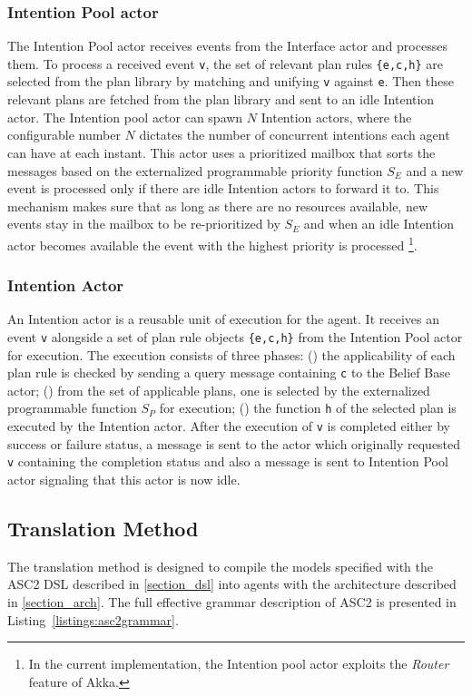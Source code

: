 \subsubsection{Intention Pool actor}
The Intention Pool actor receives events from the Interface actor and processes them. To process a received event \verb+v+, the set of relevant plan rules \verb+{e,c,h}+ are selected from the plan library by matching and unifying \verb+v+ against \verb+e+. Then these relevant plans are fetched from the plan library and sent to an idle Intention actor. The Intention pool actor can spawn $N$ Intention actors, where the configurable number $N$ dictates the number of concurrent intentions each agent can have at each instant. This actor uses a prioritized mailbox that sorts the messages based on the externalized programmable priority function $S_E$ and a new event is processed only if there are idle Intention actors to forward it to. This mechanism makes sure that as long as there are no resources available, new events stay in the mailbox to be re-prioritized by $S_E$ and when an idle Intention actor becomes available the event with the highest priority is processed \footnote{In the current implementation, the Intention pool actor exploits the \textit{Router} feature of Akka.}. %

\subsubsection{Intention Actor}
An Intention actor is a reusable unit of execution for the agent. It receives an event \verb+v+ alongside a set of plan rule objects \verb+{e,c,h}+ from the Intention Pool actor for execution. The execution consists of three phases: () the applicability of each plan rule is checked by sending a query message containing \verb+c+ to the Belief Base actor; () from the set of applicable plans, one is selected by the externalized programmable function $S_P$ for execution; () the function  \verb+h+ of the selected plan is executed by the Intention actor. After the execution of \verb+v+ is completed either by success or failure status, a message is sent to the actor which originally requested \verb+v+ containing the completion status and also a message is sent to Intention Pool actor signaling that this actor is now idle.


\subsection{Translation Method}
\label{ssec:translation}
The translation method is designed to compile the models specified with the ASC2 DSL described in \ref{section_dsl} into agents with the architecture described in \ref{section_arch}. The full effective grammar description of ASC2 is presented in Listing~\ref{listings:asc2grammar}. 

